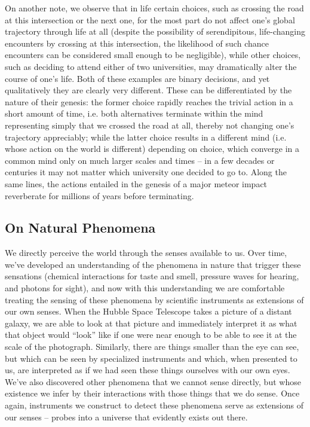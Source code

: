 \documentclass[pra,twocolumn,groupedaddress,10pt]{revtex4}
\theoremstyle{definition}
\begin{document}
On another note, we observe that in life certain choices, such as crossing the road at this intersection or the next one, for the most part do not affect one's global trajectory through life at all (despite the possibility of serendipitous, life-changing encounters by crossing at this intersection, the likelihood of such chance encounters can be considered small enough to be negligible), while other choices, such as deciding to attend either of two universities, may dramatically alter the course of one's life. Both of these examples are binary decisions, and yet qualitatively they are clearly very different. These can be differentiated by the nature of their genesis: the former choice rapidly reaches the trivial action in a short amount of time, i.e. both alternatives terminate within the mind representing simply that we crossed the road at all, thereby not changing one's trajectory appreciably; while the latter choice results in a different mind (i.e. whose action on the world is different) depending on choice, which converge in a common mind only on much larger scales and times -- in a few decades or centuries it may not matter which university one decided to go to. Along the same lines, the actions entailed in the genesis of a major meteor impact reverberate for millions of years before terminating. %

\subsection{On Natural Phenomena} \label{sec:natphe}

We directly perceive the world through the senses available to us. Over time, we've developed an understanding of the phenomena in nature that trigger these sensations (chemical interactions for taste and smell, pressure waves for hearing, and photons for sight), and now with this understanding we are comfortable treating the sensing of these phenomena by scientific instruments as extensions of our own senses. When the Hubble Space Telescope takes a picture of a distant galaxy, we are able to look at that picture and immediately interpret it as what that object would ``look'' like if one were near enough to be able to see it at the scale of the photograph. Similarly, there are things smaller than the eye can see, but which can be seen by specialized instruments and which, when presented to us, are interpreted as if we had seen these things ourselves with our own eyes. We've also discovered other phenomena that we cannot sense directly, but whose existence we infer by their interactions with those things that we do sense. Once again, instruments we construct to detect these phenomena serve as extensions of our senses -- probes into a universe that evidently exists out there.
\end{document}
